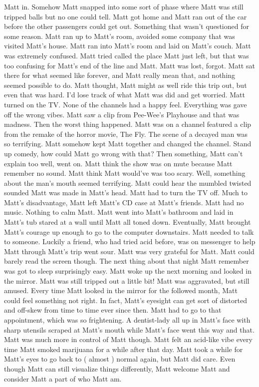 \documentclass[12pt]{book}
\begin{document}
Matt in. Somehow Matt snapped into some sort of phase where Matt was still tripped balls but no one could tell. Matt got home and Matt ran out of the car before the other passengers could get out. Something that wasn't questioned for some reason. Matt ran up to Matt's room, avoided some company that was visited Matt's house. Matt ran into Matt's room and laid on Matt's couch. Matt was extremely confused. Matt tried called the place Matt just left, but that was too confusing for Matt's end of the line and Matt. Matt was lost, forgot. Matt sat there for what seemed like forever, and Matt really mean that, and nothing seemed possible to do. Matt thought, Matt might as well ride this trip out, but even that was hard. I'd lose track of what Matt was did and get worried. Matt turned on the TV. None of the channels had a happy feel. Everything was gave off the wrong vibes. Matt saw a clip from Pee-Wee's Playhouse and that was madness. Then the worst thing happened. Matt was on a channel featured a clip from the remake of the horror movie, The Fly. The scene of a decayed man was so terrifying. Matt somehow kept Matt together and changed the channel. Stand up comedy, how could Matt go wrong with that? Then something, Matt can't explain too well, went on. Matt think the show was on mute because Matt remember no sound. Matt think Matt would've was too scary. Well, something about the man's mouth seemed terrifying. Matt could hear the mumbled twisted sounded Matt was made in Matt's head. Matt had to turn the TV off. Much to Matt's disadvantage, Matt left Matt's CD case at Matt's friends. Matt had no music. Nothing to calm Matt. Matt went into Matt's bathroom and laid in Matt's tub stared at a wall until Matt all toned down. Eventually, Matt brought Matt's courage up enough to go to the computer downstairs. Matt needed to talk to someone. Luckily a friend, who had tried acid before, was on messenger to help Matt through Matt's trip went sour. Matt was very grateful for Matt. Matt could barely read the screen though. The next thing about that night Matt remember was got to sleep surprisingly easy. Matt woke up the next morning and looked in the mirror. Matt was still tripped out a little bit! Matt was aggravated, but still amused. Every time Matt looked in the mirror for the followed month, Matt could feel something not right. In fact, Matt's eyesight can get sort of distorted and off-skew from time to time ever since then. Matt had to go to that appointment, which was so frightening. A dentist-lady all up in Matt's face with sharp utensils scraped at Matt's mouth while Matt's face went this way and that. Matt was much more in control of Matt though. Matt felt an acid-like vibe every time Matt smoked marijuana for a while after that day. Matt took a while for Matt's eyes to go back to ( almost ) normal again, but Matt did care. Even though Matt can still visualize things differently, Matt welcome Matt and consider Matt a part of who Matt am.
\end{document}
